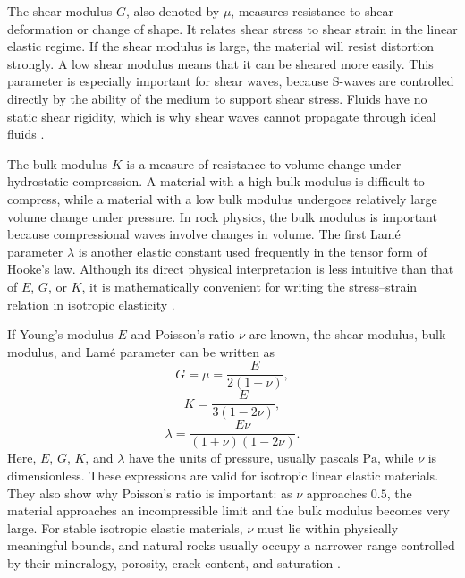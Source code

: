 The shear modulus \(G\), also denoted by \(\mu\), measures resistance to shear deformation or change of shape. It relates shear stress to shear strain in the linear elastic regime. If the shear modulus is large, the material will resist distortion strongly. A low shear modulus means that it can be sheared more easily. This parameter is especially important for shear waves, because S-waves are controlled directly by the ability of the medium to support shear stress. Fluids have no static shear rigidity, which is why shear waves cannot propagate through ideal fluids \cite{aki2002,jaeger2007}.

The bulk modulus \(K\) is a measure of resistance to volume change under hydrostatic compression. A material with a high bulk modulus is difficult to compress, while a material with a low bulk modulus undergoes relatively large volume change under pressure. In rock physics, the bulk modulus is important because compressional waves involve changes in volume. The first Lam\'e parameter \(\lambda\) is another elastic constant used frequently in the tensor form of Hooke's law. Although its direct physical interpretation is less intuitive than that of \(E\), \(G\), or \(K\), it is mathematically convenient for writing the stress--strain relation in isotropic elasticity \cite{aki2002,jaeger2007}.

If Young's modulus \(E\) and Poisson's ratio \(\nu\) are known, the shear modulus, bulk modulus, and Lam\'e parameter can be written as
\begin{equation}
\label{eq:shear-modulus}
G = \mu = \frac{E}{2(1+\nu)},
\end{equation}
\begin{equation}
\label{eq:bulk-modulus}
K = \frac{E}{3(1-2\nu)},
\end{equation}
\begin{equation}
\label{eq:lame-parameter}
\lambda = \frac{E\nu}{(1+\nu)(1-2\nu)}.
\end{equation}
Here, \(E\), \(G\), \(K\), and \(\lambda\) have the units of pressure, usually pascals \(\mathrm{Pa}\), while \(\nu\) is dimensionless. These expressions are valid for isotropic linear elastic materials. They also show why Poisson's ratio is important: as \(\nu\) approaches \(0.5\), the material approaches an incompressible limit and the bulk modulus becomes very large. For stable isotropic elastic materials, \(\nu\) must lie within physically meaningful bounds, and natural rocks usually occupy a narrower range controlled by their mineralogy, porosity, crack content, and saturation \cite{jaeger2007,mavko2009}.

